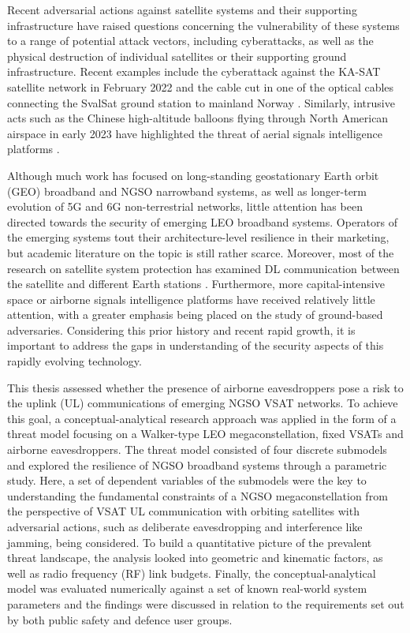 \documentclass[english, 12pt, a4paper, elec, utf8, a-1b, online]{aaltothesis}
\begin{document}
Recent adversarial actions against satellite systems and their supporting infrastructure have raised questions concerning the vulnerability of these systems to a range of potential attack vectors, including cyberattacks, as well as the physical destruction of individual satellites or their supporting ground infrastructure.
Recent examples include the cyberattack against the KA-SAT satellite network in February 2022 \cite{boschetti2022space} and the cable cut in one of the optical cables connecting the SvalSat ground station to mainland Norway \cite{schia2023subsea}.
Similarly, intrusive acts such as the Chinese high-altitude balloons flying through North American airspace in early 2023 have highlighted the threat of aerial signals intelligence platforms \cite{ap-news-2023-02-balloon-signals}.

Although much work has focused on long-standing geostationary Earth orbit (GEO) broadband and NGSO narrowband systems, as well as longer-term evolution of 5G and 6G non-terrestrial networks, little attention has been directed towards the security of emerging LEO broadband systems.
Operators of the emerging systems tout their architecture-level resilience in their marketing, but academic literature on the topic is still rather scarce.
Moreover, most of the research on satellite system protection has examined DL communication between the satellite and different Earth stations \cite{abdelsalam2023physical}.
Furthermore, more capital-intensive space or airborne signals intelligence platforms have received relatively little attention, with a greater emphasis being placed on the study of ground-based adversaries.
Considering this prior history and recent rapid growth, it is important to address the gaps in understanding of the security aspects of this rapidly evolving technology. 

This thesis assessed whether the presence of airborne eavesdroppers pose a risk to the uplink (UL) communications of emerging NGSO VSAT networks.
To achieve this goal, a conceptual-analytical research approach was applied in the form of a threat model focusing on a Walker-type LEO megaconstellation, fixed VSATs and airborne eavesdroppers.
The threat model consisted of four discrete submodels and explored the resilience of NGSO broadband systems through a parametric study.
Here, a set of dependent variables of the submodels were the key to understanding the fundamental constraints of a NGSO megaconstellation from the perspective of VSAT UL communication with orbiting satellites with adversarial actions, such as deliberate eavesdropping and interference like jamming, being considered.
To build a quantitative picture of the prevalent threat landscape, the analysis looked into geometric and kinematic factors, as well as radio frequency (RF) link budgets. 
Finally, the conceptual-analytical model was evaluated numerically against a set of known real-world system parameters and the findings were discussed in relation to the requirements set out by both public safety and defence user groups.
\end{document}
